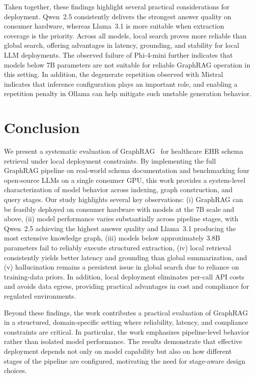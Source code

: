 \documentclass{article}
\begin{document}
Taken together, these findings highlight several practical considerations for deployment. Qwen~2.5 consistently delivers the strongest answer quality on consumer hardware, whereas Llama~3.1 is more suitable when extraction coverage is the priority. Across all models, local search proves more reliable than global search, offering advantages in latency, grounding, and stability for local LLM deployments. The observed failure of Phi-4-mini further indicates that models below 7B parameters are not suitable for reliable GraphRAG operation in this setting. In addition, the degenerate repetition observed with Mistral indicates that inference configuration plays an important role, and enabling a repetition penalty in Ollama can help mitigate such unstable generation behavior.

\section{Conclusion}
\label{sec:conclusion}

We present a systematic evaluation of GraphRAG~\cite{edge2024local} for healthcare EHR schema retrieval under local deployment constraints. By implementing the full GraphRAG pipeline on real-world schema documentation and benchmarking four open-source LLMs on a single consumer GPU, this work provides a system-level characterization of model behavior across indexing, graph construction, and query stages. Our study highlights several key observations: (i) GraphRAG can be feasibly deployed on consumer hardware with models at the 7B scale and above, (ii) model performance varies substantially across pipeline stages, with Qwen~2.5 achieving the highest answer quality and Llama~3.1 producing the most extensive knowledge graph, (iii) models below approximately 3.8B parameters fail to reliably execute structured extraction, (iv) local retrieval consistently yields better latency and grounding than global summarization, and (v) hallucination remains a persistent issue in global search due to reliance on training-data priors. In addition, local deployment eliminates per-call API costs and avoids data egress, providing practical advantages in cost and compliance for regulated environments.

Beyond these findings, the work contributes a practical evaluation of GraphRAG in a structured, domain-specific setting where reliability, latency, and compliance constraints are critical. In particular, the work emphasizes pipeline-level behavior rather than isolated model performance. The results demonstrate that effective deployment depends not only on model capability but also on how different stages of the pipeline are configured, motivating the need for stage-aware design choices.
\end{document}
